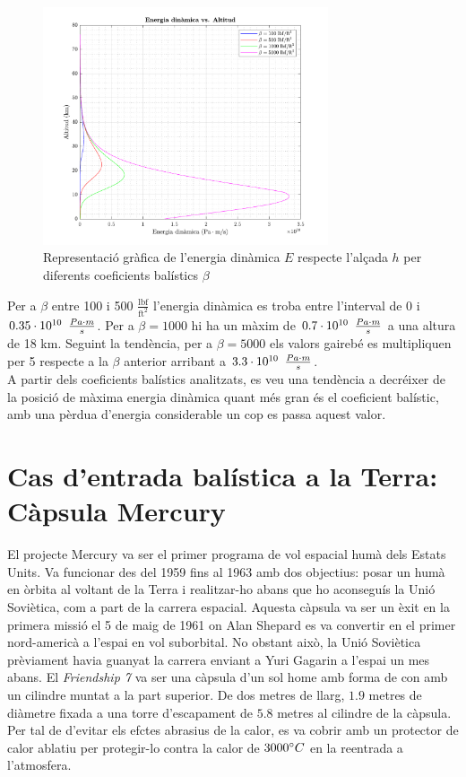 \begin{figure}[ht]
    \centering
    \includegraphics[width=0.75\textwidth]{imagenes/01_ballistic_graficas/energia_dinamica.pdf}
    \caption{Representació gràfica de l'energia dinàmica $E$ respecte l'alçada $h$ per diferents coeficients balístics $\beta$}
    \label{fig:energia_dinamca}
\end{figure}

Per a $\beta$ entre 100 i 500 $\frac{\mathrm{lbf}}{\mathrm{ft}^2}$ l'energia dinàmica es troba entre l'interval de 0 i $0.35 \cdot 10^{10} \enskip \frac{Pa \cdot m}{s}$. Per a $\beta = 1000$ hi ha un màxim de $0.7\cdot 10^{10} \enskip \frac{Pa \cdot m}{s}$ a una altura de 18 km. Seguint la tendència, per a $\beta = 5000$ els valors gairebé es multipliquen per 5 respecte a la $\beta$ anterior arribant a $3.3 \cdot 10^{10} \enskip \frac{Pa \cdot m}{s}$. \\
A partir dels coeficients balístics analitzats, es veu una tendència a decréixer de la posició de màxima energia dinàmica quant més gran és el coeficient balístic, amb una pèrdua d'energia considerable un cop es passa aquest valor.


\newpage
\clearpage
\section{Cas d'entrada balística a la Terra: Càpsula Mercury}

El projecte Mercury va ser el primer programa de vol espacial humà dels Estats Units. Va funcionar des del 1959 fins al 1963 amb dos objectius: posar un humà en òrbita al voltant de la Terra i realitzar-ho abans que ho aconseguís la Unió Soviètica, com a part de la carrera espacial. Aquesta càpsula va ser un èxit en la primera missió el 5 de maig de 1961 on Alan Shepard es va convertir en el primer nord-americà a l'espai en vol suborbital. No obstant això, la Unió Soviètica prèviament havia guanyat la carrera enviant a Yuri Gagarin a l'espai un mes abans.
El \textit{Friendship 7} va ser una càpsula d'un sol home amb forma de con amb un cilindre muntat a la part superior. De dos metres de llarg, $1.9$ metres de diàmetre fixada a una torre d'escapament de $5.8$ metres al cilindre de la càpsula. Per tal de d'evitar els efctes abrasius de la calor, es va cobrir amb un protector de calor ablatiu per protegir-lo contra la calor de $3000\mathrm{^{\circ}} C$ en la reentrada a l’atmosfera.

